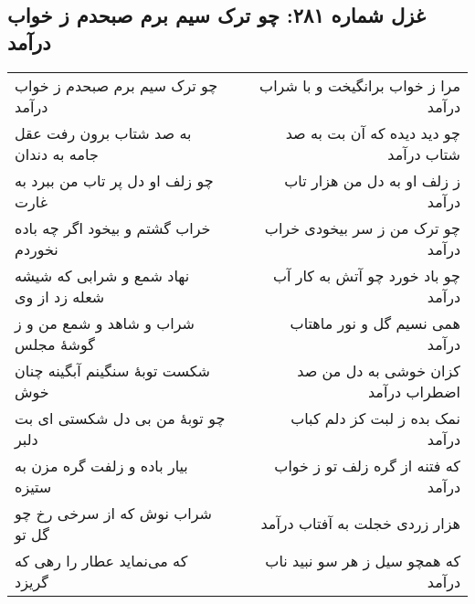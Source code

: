\begin{center}
\section*{غزل شماره ۲۸۱: چو ترک سیم برم صبحدم ز خواب درآمد}
\label{sec:281}
\begin{longtable}{l p{0.5cm} r}
چو ترک سیم برم صبحدم ز خواب درآمد
&&
مرا ز خواب برانگیخت و با شراب درآمد
\\
به صد شتاب برون رفت عقل جامه به دندان
&&
چو دید دیده که آن بت به صد شتاب درآمد
\\
چو زلف او دل پر تاب من ببرد به غارت
&&
ز زلف او به دل من هزار تاب درآمد
\\
خراب گشتم و بیخود اگر چه باده نخوردم
&&
چو ترک من ز سر بیخودی خراب درآمد
\\
نهاد شمع و شرابی که شیشه شعله زد از وی
&&
چو باد خورد چو آتش به کار آب درآمد
\\
شراب و شاهد و شمع من و ز گوشهٔ مجلس
&&
همی نسیم گل و نور ماهتاب درآمد
\\
شکست توبهٔ سنگینم آبگینه چنان خوش
&&
کزان خوشی به دل من صد اضطراب درآمد
\\
چو توبهٔ من بی دل شکستی ای بت دلبر
&&
نمک بده ز لبت کز دلم کباب درآمد
\\
بیار باده و زلفت گره مزن به ستیزه
&&
که فتنه از گره زلف تو ز خواب درآمد
\\
شراب نوش که از سرخی رخ چو گل تو
&&
هزار زردی خجلت به آفتاب درآمد
\\
که می‌نماید عطار را رهی که گریزد
&&
که همچو سیل ز هر سو نبید ناب درآمد
\\
\end{longtable}
\end{center}
